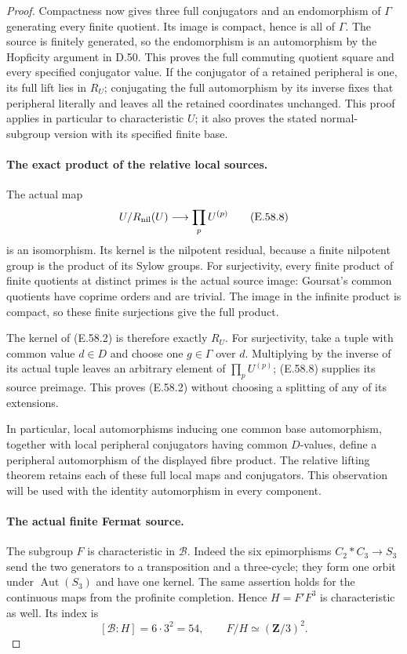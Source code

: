\begin{proof}
Compactness now gives three full conjugators and an endomorphism
of \(\Gamma\) generating every finite quotient. Its image is
compact, hence is all of \(\Gamma\). The source is finitely
generated, so the endomorphism is an automorphism by the
Hopficity argument in D.50. This proves the full commuting
quotient square and every specified conjugator value.
If the conjugator of a retained peripheral is one, its full
lift lies in \(R_U\); conjugating the full automorphism by
its inverse fixes that peripheral literally and leaves all
the retained coordinates unchanged.
This proof applies in particular to characteristic \(U\);
it also proves the stated normal-subgroup version with its
specified finite base.

\paragraph{The exact product of the relative local sources.}
The actual map
\[
 U/R_{\rm nil}(U)\longrightarrow\prod_p U^{(p)}
 \tag{E.58.8}
\]
is an isomorphism. Its kernel is the nilpotent residual,
because a finite nilpotent group is the product of its Sylow
groups. For surjectivity, every finite product of finite
quotients at distinct primes is the actual source image:
Goursat's common quotients have coprime orders and are trivial.
The image in the infinite product is compact, so these finite
surjections give the full product.

The kernel of \textup{(E.58.2)} is therefore exactly \(R_U\).
For surjectivity, take a tuple with common value \(d\in D\)
and choose one \(g\in\Gamma\) over \(d\). Multiplying by
the inverse of its actual tuple leaves an arbitrary element of
\(\prod_pU^{(p)}\); \textup{(E.58.8)} supplies its source
preimage. This proves \textup{(E.58.2)} without choosing a
splitting of any of its extensions.

In particular, local automorphisms inducing one common base
automorphism, together with local peripheral conjugators
having common \(D\)-values, define a peripheral automorphism
of the displayed fibre product. The relative lifting theorem
retains each of these full local maps and conjugators.
This observation will be used with the identity automorphism
in every component.

\paragraph{The actual finite Fermat source.}
The subgroup \(F\) is characteristic in \(\mathcal B\).
Indeed the six epimorphisms \(C_2*C_3\to S_3\) send the
two generators to a transposition and a three-cycle; they
form one orbit under \(\operatorname{Aut}(S_3)\) and have
one kernel. The same assertion holds for the continuous
maps from the profinite completion. Hence \(H=F'F^3\)
is characteristic as well. Its index is
\[
 [\mathcal B:H]=6\cdot3^2=54,
 \qquad F/H\simeq(\mathbf Z/3)^2.
 \tag{E.58.9}
\]


\end{proof}
